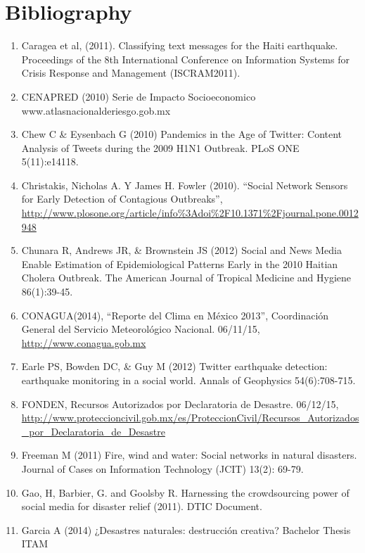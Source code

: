 \documentclass[]{article}
\begin{document}
\section{Bibliography}\label{bibliography}

\begin{enumerate}
\def\labelenumi{\arabic{enumi}.}
\itemsep1pt\parskip0pt
\item
  Caragea et al, (2011). Classifying text messages for the Haiti
  earthquake. Proceedings of the 8th International Conference on
  Information Systems for Crisis Response and Management (ISCRAM2011).
\item
  CENAPRED (2010) Serie de Impacto Socioeconomico
  www.atlasnacionalderiesgo.gob.mx
\item
  Chew C \& Eysenbach G (2010) Pandemics in the Age of Twitter: Content
  Analysis of Tweets during the 2009 H1N1 Outbreak. PLoS ONE
  5(11):e14118.
\item
  Christakis, Nicholas A. Y James H. Fowler (2010). ``Social Network
  Sensors for Early Detection of Contagious Outbreaks'',
  \url{http://www.plosone.org/article/info\%3Adoi\%2F10.1371\%2Fjournal.pone.0012948}
\item
  Chunara R, Andrews JR, \& Brownstein JS (2012) Social and News Media
  Enable Estimation of Epidemiological Patterns Early in the 2010
  Haitian Cholera Outbreak. The American Journal of Tropical Medicine
  and Hygiene 86(1):39-45.
\item
  CONAGUA(2014), ``Reporte del Clima en México 2013'', Coordinación
  General del Servicio Meteorológico Nacional. 06/11/15,
  \url{http://www.conagua.gob.mx}
\item
  Earle PS, Bowden DC, \& Guy M (2012) Twitter earthquake detection:
  earthquake monitoring in a social world. Annals of Geophysics
  54(6):708-715.
\item
  FONDEN, Recursos Autorizados por Declaratoria de Desastre. 06/12/15,
  \url{http://www.proteccioncivil.gob.mx/es/ProteccionCivil/Recursos_Autorizados_por_Declaratoria_de_Desastre}
\item
  Freeman M (2011) Fire, wind and water: Social networks in natural
  disasters. Journal of Cases on Information Technology (JCIT) 13(2):
  69-79.
\item
  Gao, H, Barbier, G. and Goolsby R. Harnessing the crowdsourcing power
  of social media for disaster relief (2011). DTIC Document.
\item
  Garcia A (2014) ¿Desastres naturales: destrucción creativa? Bachelor
  Thesis ITAM

\end{enumerate}
\end{document}
